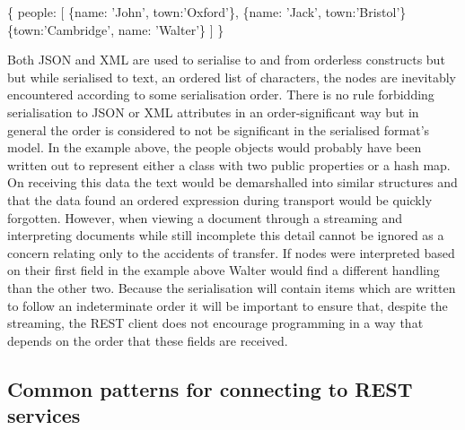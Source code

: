 \documentclass[]{article}
\newenvironment{Shaded}{}{}
\newcommand{\DataTypeTok}[1]{\textcolor[rgb]{0.56,0.13,0.00}{{#1}}}
\newcommand{\StringTok}[1]{\textcolor[rgb]{0.25,0.44,0.63}{{#1}}}
\newcommand{\NormalTok}[1]{{#1}}
\begin{document}
\begin{Shaded}
\begin{Highlighting}[]
\NormalTok{\{}
   \DataTypeTok{people}\NormalTok{: [}
      \NormalTok{\{}\DataTypeTok{name}\NormalTok{: }\StringTok{'John'}\NormalTok{, }\DataTypeTok{town}\NormalTok{:}\StringTok{'Oxford'}\NormalTok{\},}
      \NormalTok{\{}\DataTypeTok{name}\NormalTok{: }\StringTok{'Jack'}\NormalTok{, }\DataTypeTok{town}\NormalTok{:}\StringTok{'Bristol'}\NormalTok{\}}
      \NormalTok{\{}\DataTypeTok{town}\NormalTok{:}\StringTok{'Cambridge'}\NormalTok{, }\DataTypeTok{name}\NormalTok{: }\StringTok{'Walter'}\NormalTok{\}}
   \NormalTok{]}
\NormalTok{\}}
\end{Highlighting}
\end{Shaded}

Both JSON and XML are used to serialise to and from orderless constructs
but but while serialised to text, an ordered list of characters, the
nodes are inevitably encountered according to some serialisation order.
There is no rule forbidding serialisation to JSON or XML attributes in
an order-significant way but in general the order is considered to not
be significant in the serialised format's model. In the example above,
the people objects would probably have been written out to represent
either a class with two public properties or a hash map. On receiving
this data the text would be demarshalled into similar structures and
that the data found an ordered expression during transport would be
quickly forgotten. However, when viewing a document through a streaming
and interpreting documents while still incomplete this detail cannot be
ignored as a concern relating only to the accidents of transfer. If
nodes were interpreted based on their first field in the example above
Walter would find a different handling than the other two. Because the
serialisation will contain items which are written to follow an
indeterminate order it will be important to ensure that, despite the
streaming, the REST client does not encourage programming in a way that
depends on the order that these fields are received.

\subsection{Common patterns for connecting to REST services}
\end{document}
